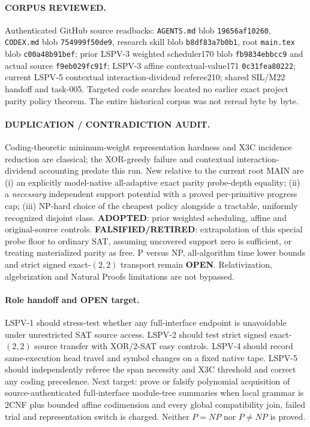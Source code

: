 \documentclass{article}
\begin{document}
\paragraph{CORPUS REVIEWED.}
Authenticated GitHub source readbacks: \texttt{AGENTS.md} blob \texttt{19656af10260}, \texttt{CODEX.md} blob \texttt{754999f50de9}, research skill blob \texttt{b8df83a7b0b1}, root \texttt{main.tex} blob \texttt{c00a48b91bef}; prior LSPV-3 weighted scheduler170 blob \texttt{fb9834ebbcc9} and actual source \texttt{f9eb029fc91f}; LSPV-3 affine contextual-value171 \texttt{0c31fea80222}; current LSPV-5 contextual interaction-dividend referee210; shared SIL/M22 handoff and task-005. Targeted code searches located no earlier exact project parity policy theorem. The entire historical corpus was not reread byte by byte.

\paragraph{DUPLICATION / CONTRADICTION AUDIT.}
Coding-theoretic minimum-weight representation hardness and X3C incidence reduction are classical; the XOR-greedy failure and contextual interaction-dividend accounting predate this run. New relative to the current root MAIN are (i) an explicitly model-native all-adaptive exact parity probe-depth equality; (ii) a \emph{necessary} independent support potential with a proved per-primitive progress cap; (iii) NP-hard choice of the cheapest policy alongside a tractable, uniformly recognized disjoint class. \textbf{ADOPTED}: prior weighted scheduling, affine and original-source controls. \textbf{FALSIFIED/RETIRED}: extrapolation of this special probe floor to ordinary SAT, assuming uncovered support zero is sufficient, or treating materialized parity as free. P versus NP, all-algorithm time lower bounds and strict signed exact-$(2,2)$ transport remain \textbf{OPEN}. Relativization, algebrization and Natural Proofs limitations are not bypassed.

\paragraph{Role handoff and OPEN target.}
LSPV-1 should stress-test whether any full-interface endpoint is unavoidable under unrestricted SAT source access. LSPV-2 should test strict signed exact-$(2,2)$ source transfer with XOR/2-SAT easy controls. LSPV-4 should record same-execution head travel and symbol changes on a fixed native tape. LSPV-5 should independently referee the span necessity and X3C threshold and correct any coding precedence. Next target: prove or falsify polynomial acquisition of source-authenticated full-interface module-tree summaries when local grammar is 2CNF plus bounded affine codimension and every global compatibility join, failed trial and representation switch is charged. Neither $P=NP$ nor $P\ne NP$ is proved.
\end{document}
